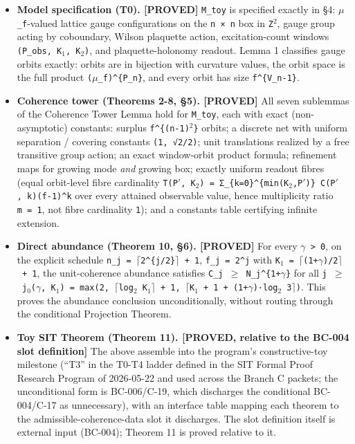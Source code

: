 \documentclass[
  american,
  11pt,
  letterpaper,
]{article}
\providecommand{\tightlist}{%
  \setlength{\itemsep}{0pt}\setlength{\parskip}{0pt}}
\begin{document}
\begin{itemize}
\tightlist
\item
  \textbf{Model specification (T0). {[}PROVED{]}} \texttt{M\_toy} is specified exactly in §4: \texttt{\ensuremath{\mu}\_f}-valued lattice gauge configurations on the \texttt{n\ ×\ n} box in \texttt{Z\ensuremath{{}^{2}}}, gauge group acting by coboundary, Wilson plaquette action, excitation-count windows \texttt{(P\_obs,\ K\ensuremath{{}_{1}},\ K\ensuremath{{}_{2}})}, and plaquette-holonomy readout. Lemma 1 classifies gauge orbits exactly: orbits are in bijection with curvature values, the orbit space is the full product \texttt{(\ensuremath{\mu}\_f)\^{}\{P\_n\}}, and every orbit has size \texttt{f\^{}\{\textbar{}V\_n\textbar{}-1\}}.
\item
  \textbf{Coherence tower (Theorems 2-8, §5). {[}PROVED{]}} All seven sublemmas of the Coherence Tower Lemma hold for \texttt{M\_toy}, each with exact (non-asymptotic) constants: surplus \texttt{f\^{}\{(n-1)\ensuremath{{}^{2}}\}} orbits; a discrete net with uniform separation / covering constants \texttt{(1,\ √2/2)}; unit translations realized by a free transitive group action; an exact window-orbit product formula; refinement maps for growing mode \emph{and} growing box; exactly uniform readout fibres (equal orbit-level fibre cardinality \texttt{\textbar{}T(P\ensuremath{'},\ K\ensuremath{{}_{2}})\textbar{}\ =\ Σ\_\{k=0\}\^{}\{min(K\ensuremath{{}_{2}},\textbar{}P\ensuremath{'}\textbar{})\}\ C(\textbar{}P\ensuremath{'}\textbar{},\ k)(f-1)\^{}k} over every attained observable value, hence multiplicity ratio \texttt{m\ =\ 1}, not fibre cardinality \texttt{1}); and a constants table certifying infinite extension.
\item
  \textbf{Direct abundance (Theorem 10, §6). {[}PROVED{]}} For every \texttt{\ensuremath{\gamma}\ \textgreater{}\ 0}, on the explicit schedule \texttt{n\_j\ =\ \ensuremath{\lceil}2\^{}\{j/2\}\ensuremath{\rceil}\ +\ 1}, \texttt{f\_j\ =\ 2\^{}j} with \texttt{K\ensuremath{{}_{1}}\ =\ \ensuremath{\lceil}(1+\ensuremath{\gamma})/2\ensuremath{\rceil}\ +\ 1}, the unit-coherence abundance satisfies \texttt{C\_j\ \ensuremath{\geq}\ N\_j\^{}\{1+\ensuremath{\gamma}\}} for all \texttt{j\ \ensuremath{\geq}\ j\ensuremath{{}_{0}}(\ensuremath{\gamma},\ K\ensuremath{{}_{1}})\ =\ max(2,\ \ensuremath{\lceil}log\ensuremath{{}_{2}}\ K\ensuremath{{}_{1}}\ensuremath{\rceil}\ +\ 1,\ \ensuremath{\lceil}K\ensuremath{{}_{1}}\ +\ 1\ +\ (1+\ensuremath{\gamma})·log\ensuremath{{}_{2}}\ 3\ensuremath{\rceil})}. This proves the abundance conclusion unconditionally, without routing through the conditional Projection Theorem.
\item
  \textbf{Toy SIT Theorem (Theorem 11). {[}PROVED, relative to the BC-004 slot definition{]}} The above assemble into the program's constructive-toy milestone (``T3'' in the T0-T4 ladder defined in the SIT Formal Proof Research Program of 2026-05-22 and used across the Branch C packets; the unconditional form is BC-006/C-19, which discharges the conditional BC-004/C-17 as unnecessary), with an interface table mapping each theorem to the admissible-coherence-data slot it discharges. The slot definition itself is external input (BC-004); Theorem 11 is proved relative to it.
\end{itemize}
\end{document}
